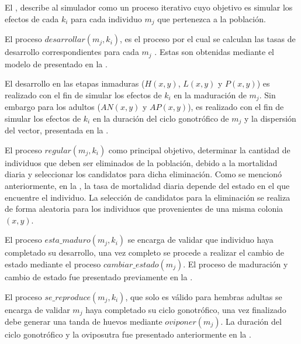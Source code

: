 El , describe al simulador como un proceso iterativo cuyo objetivo
es simular los efectos de cada $k_{i}$ para cada individuo $m_{j}$ que pertenezca a la población.

El proceso $desarrollar(m_{j}, k_{i})$, es el proceso por el cual se calculan las tasas de
desarrollo correspondientes para cada $m_{j}$ . Estas son obtenidas mediante el modelo de
\cite{sharpe1977reaction} presentado en la .

El desarrollo en las etapas inmaduras ($H(x,y)$, $L(x,y)$ y $P(x,y)$) es realizado con el fin de
simular los efectos de $k_{i}$ en la maduración de $m_{j}$. Sin embargo para los adultos ($AN(x,y)$
y $AP(x,y)$), es realizado con el fin de simular los efectos de $k_{i}$ en la duración del ciclo
gonotrófico de $m_{j}$ y la dispersión del vector, presentada en la
.

El proceso $regular(m_{j}, k_{i})$ como principal objetivo, determinar la cantidad de individuos
que deben ser eliminados de la población, debido a la mortalidad diaria y seleccionar los
candidatos para dicha eliminación. Como se mencionó anteriormente, en la
, la tasa de mortalidad diaria depende del estado en el que
encuentre el individuo. La selección de candidatos para la eliminación se realiza de forma
aleatoria para los individuos que provenientes de una misma colonia $(x, y)$.

El proceso $esta\_maduro(m_{j}, k_{i})$ se encarga de validar que individuo haya completado su
desarrollo, una vez completo se procede a realizar el cambio de estado mediante el proceso
$cambiar\_estado(m_{j})$. El proceso de maduración y cambio de estado fue presentado previamente
en la .

El proceso $se\_reproduce(m_{j}, k_{i})$, que solo es válido para hembras adultas se encarga de
validar $m_{j}$ haya completado su ciclo gonotrófico, una vez finalizado debe generar una tanda de
huevos mediante $oviponer(m_{j})$. La duración del ciclo gonotrófico y la oviposutra fue presentado
anteriormente en la .

